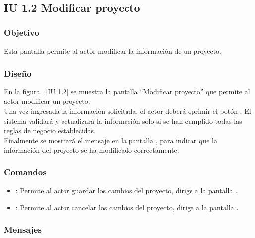 \newpage 
\subsection{IU 1.2 Modificar proyecto}

\subsubsection{Objetivo}
	
    Esta pantalla permite al actor modificar la información de un proyecto.

\subsubsection{Diseño}

    En la figura ~\ref{IU 1.2} se muestra la pantalla ``Modificar proyecto'' que permite al actor modificar un proyecto.\\
    
    Una vez ingresada la información solicitada, el actor deberá oprimir el botón . El sistema validará y actualizará la 
    información solo si se han cumplido todas las reglas de negocio establecidas.  \\
    
    Finalmente se mostrará el mensaje  en la pantalla , 
    para indicar que la información del proyecto
    se ha modificado correctamente.        



\subsubsection{Comandos}
\begin{itemize}
	\item {}: Permite al actor guardar los cambios del proyecto, dirige a la pantalla .
	\item {}: Permite al actor cancelar los cambios del proyecto, dirige a la pantalla .
\end{itemize}

\subsubsection{Mensajes}
	
